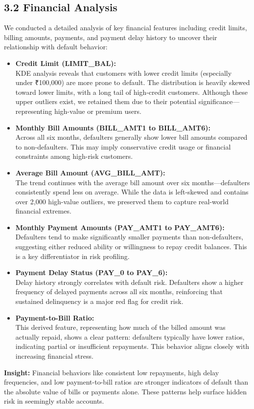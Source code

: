 \documentclass{article}
\begin{document}
\subsection*{3.2 Financial Analysis}

We conducted a detailed analysis of key financial features including credit limits, billing amounts, payments, and payment delay history to uncover their relationship with default behavior:

\begin{itemize}
    \item \textbf{Credit Limit (LIMIT\_BAL):} \\
    KDE analysis reveals that customers with lower credit limits (especially under ₹100{,}000) are more prone to default. The distribution is heavily skewed toward lower limits, with a long tail of high-credit customers. Although these upper outliers exist, we retained them due to their potential significance—representing high-value or premium users.

    \item \textbf{Monthly Bill Amounts (BILL\_AMT1 to BILL\_AMT6):} \\
    Across all six months, defaulters generally show lower bill amounts compared to non-defaulters. This may imply conservative credit usage or financial constraints among high-risk customers.

    \item \textbf{Average Bill Amount (AVG\_BILL\_AMT):} \\
    The trend continues with the average bill amount over six months—defaulters consistently spend less on average. While the data is left-skewed and contains over 2{,}000 high-value outliers, we preserved them to capture real-world financial extremes.

    \item \textbf{Monthly Payment Amounts (PAY\_AMT1 to PAY\_AMT6):} \\
    Defaulters tend to make significantly smaller payments than non-defaulters, suggesting either reduced ability or willingness to repay credit balances. This is a key differentiator in risk profiling.

    \item \textbf{Payment Delay Status (PAY\_0 to PAY\_6):} \\
    Delay history strongly correlates with default risk. Defaulters show a higher frequency of delayed payments across all six months, reinforcing that sustained delinquency is a major red flag for credit risk.

    \item \textbf{Payment-to-Bill Ratio:} \\
    This derived feature, representing how much of the billed amount was actually repaid, shows a clear pattern: defaulters typically have lower ratios, indicating partial or insufficient repayments. This behavior aligns closely with increasing financial stress.
\end{itemize}

\noindent\textbf{Insight:} Financial behaviors like consistent low repayments, high delay frequencies, and low payment-to-bill ratios are stronger indicators of default than the absolute value of bills or payments alone. These patterns help surface hidden risk in seemingly stable accounts.
\end{document}

